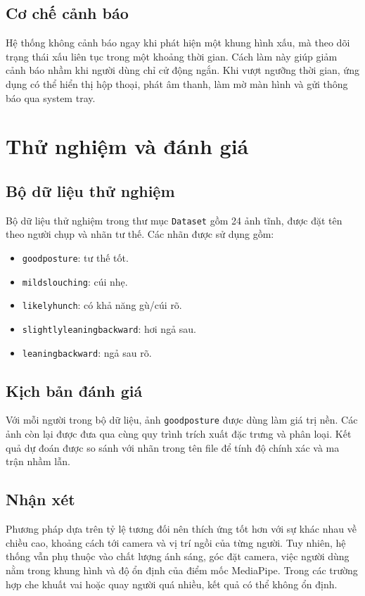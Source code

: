 \documentclass[12pt,a4paper,oneside]{report}
\begin{document}
\section{Cơ chế cảnh báo}
Hệ thống không cảnh báo ngay khi phát hiện một khung hình xấu, mà theo dõi trạng thái xấu liên tục trong một khoảng thời gian. Cách làm này giúp giảm cảnh báo nhầm khi người dùng chỉ cử động ngắn. Khi vượt ngưỡng thời gian, ứng dụng có thể hiển thị hộp thoại, phát âm thanh, làm mờ màn hình và gửi thông báo qua system tray.

\chapter{Thử nghiệm và đánh giá}

\section{Bộ dữ liệu thử nghiệm}
Bộ dữ liệu thử nghiệm trong thư mục \texttt{Dataset} gồm 24 ảnh tĩnh, được đặt tên theo người chụp và nhãn tư thế. Các nhãn được sử dụng gồm:
\begin{itemize}[leftmargin=1.2cm]
    \item \texttt{goodposture}: tư thế tốt.
    \item \texttt{mildslouching}: cúi nhẹ.
    \item \texttt{likelyhunch}: có khả năng gù/cúi rõ.
    \item \texttt{slightlyleaningbackward}: hơi ngả sau.
    \item \texttt{leaningbackward}: ngả sau rõ.
\end{itemize}

\section{Kịch bản đánh giá}
Với mỗi người trong bộ dữ liệu, ảnh \texttt{goodposture} được dùng làm giá trị nền. Các ảnh còn lại được đưa qua cùng quy trình trích xuất đặc trưng và phân loại. Kết quả dự đoán được so sánh với nhãn trong tên file để tính độ chính xác và ma trận nhầm lẫn.

\section{Nhận xét}
Phương pháp dựa trên tỷ lệ tương đối nên thích ứng tốt hơn với sự khác nhau về chiều cao, khoảng cách tới camera và vị trí ngồi của từng người. Tuy nhiên, hệ thống vẫn phụ thuộc vào chất lượng ánh sáng, góc đặt camera, việc người dùng nằm trong khung hình và độ ổn định của điểm mốc MediaPipe. Trong các trường hợp che khuất vai hoặc quay người quá nhiều, kết quả có thể không ổn định.
\end{document}
